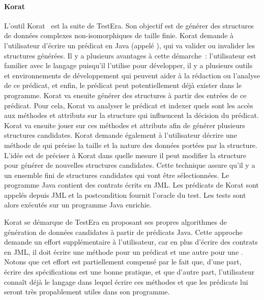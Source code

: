 \paragraph{Korat} L'outil Korat~ est la suite de TestEra.
Son objectif est de générer des structures de données complexes
non-isomorphiques de taille finie. Korat demande à l'utilisateur d'écrire un
prédicat en Java (appelé ), qui va valider ou invalider les
structures générées. Il y a plusieurs avantages à cette démarche~: l'utilisateur
est familier avec le langage puisqu'il l'utilise pour développer, il y a
plusieurs outils et environnements de développement qui peuvent aider à la
rédaction ou l'analyse de ce prédicat, et enfin, le prédicat peut
potentiellement déjà exister dans le programme. Korat va ensuite générer des
structures à partir des entrées de ce prédicat. Pour cela, Korat va analyser le
prédicat et indexer quels sont les accès aux méthodes et attributs sur la
structure qui influencent la décision du prédicat. Korat va ensuite jouer sur
ces méthodes et attributs afin de générer plusieurs structures candidates.
Korat demande également à l'utilisateur décrire une méthode de
 qui précise la taille et la nature des données portées
par la structure. L'idée est de préciser à Korat dans quelle mesure il peut
modifier la structure pour générer de nouvelles structures candidates. Cette
technique assure qu'il y a un ensemble fini de structures candidates qui vont
être sélectionnées. Le programme Java contient des contrats écrits en JML. Les
prédicats de Korat sont appelés depuis JML et la postcondition fournit l'oracle
du test. Les tests sont alors exécutés sur un programme Java enrichie.

Korat se démarque de TestEra en proposant ses propres algorithmes de génération
de données candidates à partir de prédicats Java. Cette approche demande un
effort supplémentaire à l'utilisateur, car en plus d'écrire des contrats en JML,
il doit écrire une méthode pour un prédicat et une autre pour une
. Notons que cet effort est partiellement compensé par
le fait que, d'une part, écrire des spécifications est une bonne pratique, et
que d'autre part, l'utilisateur connaît déjà le langage dans lequel écrire ces
méthodes et que les prédicats lui seront très propablement utiles dans son
programme.

